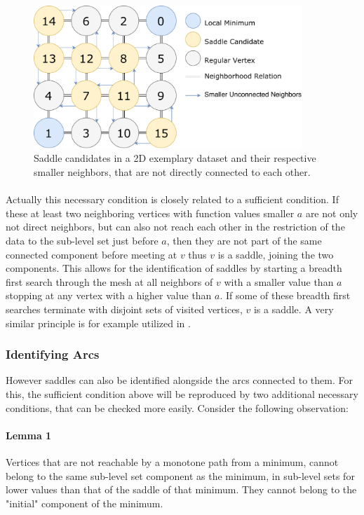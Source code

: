 \documentclass{scrartcl}
\begin{document}
\begin{figure}[h!]
\centering
\includegraphics[width=0.9\textwidth]{figures/SaddleCandidatesCrop.pdf}
\caption{Saddle candidates in a 2D exemplary dataset and their respective smaller neighbors, that are not directly connected to each other.}
\label{fig:sc}
\end{figure}

\paragraph{}
Actually this necessary condition is closely related to a sufficient condition. If these at least two neighboring vertices with function values smaller \(a\) are not only not direct neighbors, but can also not reach each other in the restriction of the data to the sub-level set just before \(a\), then they are not part of the same connected component before meeting at \(v\) thus \(v\) is a saddle, joining the two components. This allows for the identification of saddles by starting a breadth first search through the mesh at all neighbors of \(v\) with a smaller value than \(a\) stopping at any vertex with a higher value than \(a\). If some of these breadth first searches terminate with disjoint sets of visited vertices, \(v\) is a saddle. A very similar principle is for example utilized in \cite{Maadasamy}.

\subsubsection{Identifying Arcs}
However saddles can also be identified alongside the arcs connected to them. For this, the sufficient condition above will be reproduced by two additional necessary conditions, that can be checked more easily. Consider the following observation: 

\paragraph{Lemma 1} Vertices that are not reachable by a monotone path from a minimum, cannot belong to the same sub-level set component as the minimum, in sub-level sets for lower values than that of the saddle of that minimum. They cannot belong to the "initial" component of the minimum.
\end{document}
